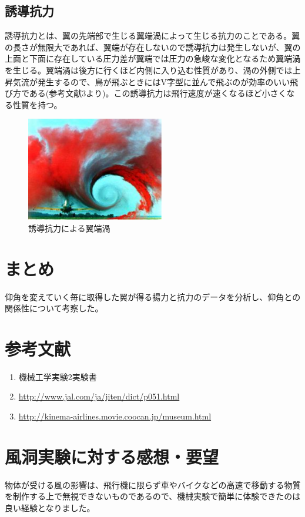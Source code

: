 \documentclass[a4j,twoside,openright,11pt]{jarticle}
\begin{document}
\subsection{誘導抗力}
誘導抗力とは、翼の先端部で生じる翼端渦によって生じる抗力のことである。翼の長さが無限大であれば、翼端が存在しないので誘導抗力は発生しないが、翼の上面と下面に存在している圧力差が翼端では圧力の急峻な変化となるため翼端渦を生じる。翼端渦は後方に行くほど内側に入り込む性質があり、渦の外側では上昇気流が発生するので、鳥が飛ぶときにはV字型に並んで飛ぶのが効率のいい飛び方である(参考文献3より)。この誘導抗力は飛行速度が速くなるほど小さくなる性質を持つ。
\begin{figure}[htbp]
\begin{center}
\includegraphics[width=6cm]{yuudoukouryoku.eps}
\end{center}
\caption{誘導抗力による翼端渦}
\end{figure}

\section{まとめ}
仰角を変えていく毎に取得した翼が得る揚力と抗力のデータを分析し、仰角との関係性について考察した。

\section{参考文献}
\begin{enumerate}
\item 機械工学実験2実験書
\item \url{http://www.jal.com/ja/jiten/dict/p051.html}
\item \url{http://kinema-airlines.movie.coocan.jp/museum.html}
\end{enumerate}

\section{風洞実験に対する感想・要望}
物体が受ける風の影響は、飛行機に限らず車やバイクなどの高速で移動する物質を制作する上で無視できないものであるので、機械実験で簡単に体験できたのは良い経験となりました。
\end{document}
